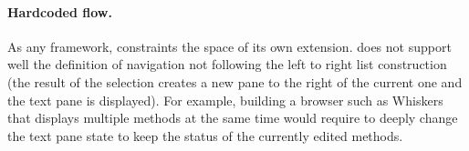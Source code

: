 \documentclass[a4paper,10pt,twoside]{book}
\begin{document}
\paragraph{Hardcoded flow.} As any framework, \obf constraints the space of its own extension. \obf does not support well the definition of navigation not following the left  to right list construction (the result of the selection creates a new pane to the right of the current one and  the text pane is displayed). For example, building a browser such as Whiskers that displays multiple methods at the same time would require to deeply change the text pane state to keep the status of the currently edited methods. 




\end{document}
